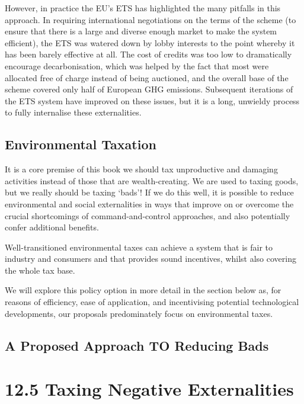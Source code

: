 \documentclass[]{tufte-handout}
\begin{document}
However, in practice the EU's ETS has highlighted the many pitfalls in
this approach. In requiring international negotiations on the terms of
the scheme (to ensure that there is a large and diverse enough market to
make the system efficient), the ETS was watered down by lobby interests
to the point whereby it has been barely effective at all. The cost of
credits was too low to dramatically encourage decarbonisation, which was
helped by the fact that most were allocated free of charge instead of
being auctioned, and the overall base of the scheme covered only half of
European GHG emissions. Subsequent iterations of the ETS system have
improved on these issues, but it is a long, unwieldy process to fully
internalise these externalities.

\hypertarget{environmental-taxation}{%
\subsection{Environmental Taxation}\label{environmental-taxation}}

It is a core premise of this book we should tax unproductive and
damaging activities instead of those that are wealth-creating. We are
used to taxing goods, but we really should be taxing `bads'! If we do
this well, it is possible to reduce environmental and social
externalities in ways that improve on or overcome the crucial
shortcomings of command-and-control approaches, and also potentially
confer additional benefits.

Well-transitioned environmental taxes can achieve a system that is fair
to industry and consumers and that provides sound incentives, whilst
also covering the whole tax base.

We will explore this policy option in more detail in the section below
as, for reasons of efficiency, ease of application, and incentivising
potential technological developments, our proposals predominately focus
on environmental taxes.

\hypertarget{a-proposed-approach-to-reducing-bads}{%
\subsection{A Proposed Approach TO Reducing
Bads}\label{a-proposed-approach-to-reducing-bads}}

\hypertarget{taxing-negative-externalities}{%
\section{12.5 Taxing Negative
Externalities}\label{taxing-negative-externalities}}
\end{document}
